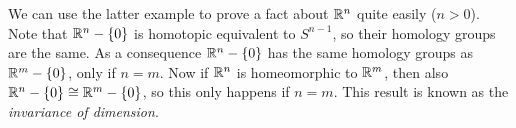 We can use the latter example to prove a fact about $\mathbb{R}^n$ quite easily ($n > 0$). Note that $\mathbb{R}^n - \{0\}$ is homotopic equivalent to $S^{n-1}$, so their homology groups are the same. As a consequence $\mathbb{R}^n - \{0\}$ has the same homology groups as $\mathbb{R}^m - \{0\}$, only if $n=m$. Now if $\mathbb{R}^n$ is homeomorphic to $\mathbb{R}^m$, then also $\mathbb{R}^n - \{0\} \cong \mathbb{R}^m - \{0\}$, so this only happens if $n=m$. This result is known as the \emph{invariance of dimension}.
